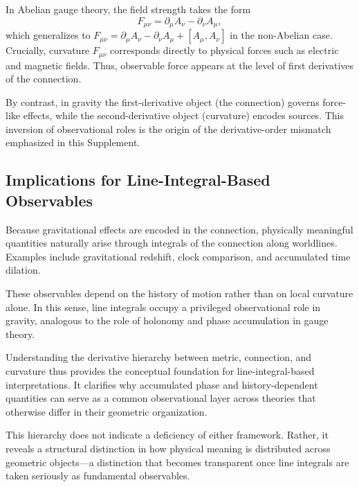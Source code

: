 \documentclass[12pt,letterpaper]{article}
\begin{document}
In Abelian gauge theory, the field strength takes the form
\begin{equation}
F_{\mu\nu} = \partial_\mu A_\nu - \partial_\nu A_\mu,
\end{equation}
which generalizes to $F_{\mu\nu} = \partial_\mu A_\nu - \partial_\nu A_\mu + [A_\mu, A_\nu]$ in the non-Abelian case. Crucially, curvature $F_{\mu\nu}$ corresponds directly to physical forces such as electric and magnetic fields.
Thus, observable force appears at the level of first derivatives of the connection.

By contrast, in gravity the first-derivative object (the connection) governs force-like effects, while the second-derivative object (curvature) encodes sources. This inversion of observational roles is the origin of the derivative-order mismatch emphasized in this Supplement.

\subsection{Implications for Line-Integral-Based Observables}

Because gravitational effects are encoded in the connection, physically meaningful quantities naturally arise through integrals of the connection along worldlines.
Examples include gravitational redshift, clock comparison, and accumulated time dilation.

These observables depend on the history of motion rather than on local curvature alone.
In this sense, line integrals occupy a privileged observational role in gravity, analogous to the role of holonomy and phase accumulation in gauge theory.

Understanding the derivative hierarchy between metric, connection, and curvature thus provides the conceptual foundation for line-integral-based interpretations.
It clarifies why accumulated phase and history-dependent quantities can serve as a common observational layer across theories that otherwise differ in their geometric organization.

This hierarchy does not indicate a deficiency of either framework.
Rather, it reveals a structural distinction in how physical meaning is distributed across geometric objects---a distinction that becomes transparent once line integrals are taken seriously as fundamental observables.
\end{document}
